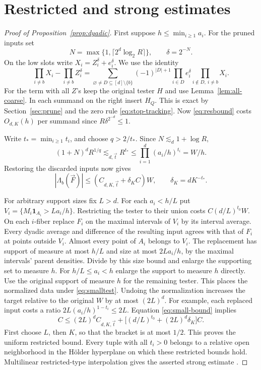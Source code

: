 \documentclass[11pt]{article}
\newcommand{\ind}{\mathbf 1}
\begin{document}
\section{Restricted and strong estimates}
\begin{proof}[Proof of Proposition~\ref{prop:dyadic}]
First suppose \(h\le\min_{i\ge1}a_i\). For the pruned inputs set
\[
       N=\max\{1,\lceil 2^d\log_2 R\rceil\},\qquad \delta=2^{-N}.
\]
On the low slots write \(X_i=Z_i^\delta+e_i^\delta\). We use the identity
\[
 \prod_{i\ne b}X_i-\prod_{i\ne b}Z_i^\delta
     =\sum_{\varnothing\ne D\subseteq[d]\setminus\{b\}}
       (-1)^{|D|+1}\prod_{i\in D}e_i^\delta
                       \prod_{i\notin D,\ i\ne b}X_i .
\]
For the term with all \(Z\)'s keep the original tester \(H\) and use
Lemma~\ref{lem:all-coarse}. In each summand on the right insert \(H_Q\).
This is exact by Section~\ref{sec:prune} and the zero rule
\eqref{eq:stop-tracking}. Now \eqref{eq:resbound} costs \(O_{d,K}(h)\)
per summand since \(R\delta^{2^{-d}}\le1\).

Write \(t_*=\min_{i\ge1}t_i\), and choose \(q>2/t_*\).
Since \(N\lesssim_d 1+\log R\),
\[
   (1+N)^d R^{1/q}\lesssim_{d,\vec t} R^{t_*}
        \le \prod_{i=1}^d (a_i/h)^{t_i}=W/h .
\]
Restoring the discarded inputs now gives
\begin{equation}\label{eq:small-bound}
            |\Lambda_b(\vec F)|
                 \le (C_{d,K,\vec t}+\delta_K C)W,\qquad
                   \delta_K=dK^{-t_*}.
\end{equation}


For arbitrary support sizes fix \(L>d\). For each \(a_i<h/L\) put
\(V_i=\{M_i\ind_{A_i}>L a_i/h\}\).
Restricting the tester to their union costs \(C(d/L)^{t_0}W\).
On each \(i\)-fiber replace \(F_i\) on the maximal intervals of
\(V_i\) by its interval average. Every dyadic average and difference
of the resulting input agrees with that of \(F_i\) at points outside
\(V_i\). Almost every point of \(A_i\) belongs to \(V_i\).
The replacement has support of measure at most \(h/L\) and size at
most \(2L a_i/h\), by the maximal intervals' parent densities.
Divide by this size bound and enlarge the supporting set to measure
\(h\). For \(h/L\le a_i<h\) enlarge the support to measure \(h\)
directly. Use the original support of measure \(h\) for the
remaining tester. This places the normalized data under
\eqref{eq:smalltest}. Undoing the normalization increases the
target relative to the original \(W\) by at most \((2L)^d\).
For example, each replaced input costs a ratio
\(2L(a_i/h)^{1-t_i}\le 2L\).
Equation \eqref{eq:small-bound} implies
\[
 C\le (2L)^d C_{d,K,\vec t}+
          \big[(d/L)^{t_0}+(2L)^d\delta_K\big] C .
\]
First choose \(L\), then \(K\), so that the bracket is at most
\(1/2\). This proves the uniform restricted bound. Every tuple with all
\(t_i>0\) belongs to a relative open neighborhood in the H\"older
hyperplane on which these restricted bounds hold. Multilinear restricted-type interpolation
gives the asserted strong estimate \cite{GT}.
\end{proof}
\end{document}
